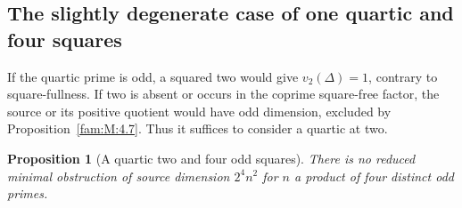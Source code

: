 \documentclass[11pt,a4paper]{article}
\numberwithin{equation}{section}
\newtheorem{proposition}[theorem]{Proposition}
\theoremstyle{remark}
\begin{document}
\subsection{The slightly degenerate case of one quartic and four squares}\label{fam:F:sec:4}\label{fam:F:n:red}
If the quartic prime is odd, a squared two would give $v_2(\Delta)=1$, contrary to square-fullness. If two is absent or occurs in the coprime square-free factor, the source or its positive quotient would have odd dimension, excluded by Proposition~\ref{fam:M:4.7}. Thus it suffices to consider a quartic at two.
\begin{proposition}[A quartic two and four odd squares]\label{fam:F:4.1}
There is no reduced minimal obstruction of source dimension
$2^4n^2$ for $n$ a product of four distinct odd primes.
\end{proposition}
\end{document}

